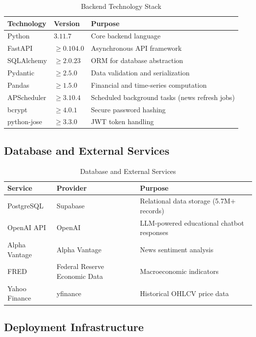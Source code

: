 \begin{table}[H]
\centering
\begin{tabular}{lll}
\toprule
\textbf{Technology} & \textbf{Version} & \textbf{Purpose} \\
\midrule
Python & \(3.11.7\) & Core backend language \\
FastAPI & \(\ge 0.104.0\) & Asynchronous API framework \\
SQLAlchemy & \(\ge 2.0.23\) & ORM for database abstraction \\
Pydantic & \(\ge 2.5.0\) & Data validation and serialization \\
Pandas & \(\ge 1.5.0\) & Financial and time-series computation \\
APScheduler & \(\ge 3.10.4\) & Scheduled background tasks (news refresh jobs) \\
bcrypt & \(\ge 4.0.1\) & Secure password hashing \\
python-jose & \(\ge 3.3.0\) & JWT token handling \\
\bottomrule
\end{tabular}
\caption{Backend Technology Stack}
\label{tab:backend_stack}
\end{table}

\subsection{Database and External Services}

\begin{table}[H]
\centering
\begin{tabular}{lll}
\toprule
\textbf{Service} & \textbf{Provider} & \textbf{Purpose} \\
\midrule
PostgreSQL & Supabase & Relational data storage (5.7M+ records) \\
OpenAI API & OpenAI & LLM-powered educational chatbot responses \\
Alpha Vantage & Alpha Vantage & News sentiment analysis \\
FRED & Federal Reserve Economic Data & Macroeconomic indicators \\
Yahoo Finance & yfinance & Historical OHLCV price data \\
\bottomrule
\end{tabular}
\caption{Database and External Services}
\label{tab:external_services}
\end{table}

\subsection{Deployment Infrastructure}

